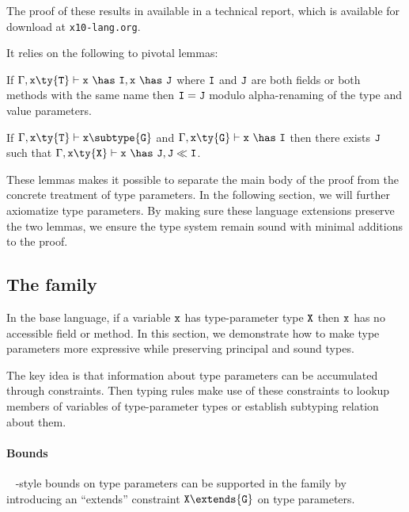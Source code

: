 The proof of these results in available in a technical report, which is available for download at {\tt x10-lang.org}.

It relies on the following to pivotal lemmas:

\begin{lemma}
If $\Gamma,{\tt x}\ty{\tt T}\vdash{\tt x}~\has~{\tt I},{\tt x}~\has~{\tt J}$ where $\tt I$ and $\tt J$ are both fields or both methods with the same name then ${\tt I}={\tt J}$ modulo alpha-renaming of the type and value parameters.
\end{lemma}

\begin{lemma}
If $\Gamma,{\tt x}\ty{\tt T}\vdash{\tt x}\subtype{\tt G}$ and $\Gamma,{\tt x}\ty{\tt G}\vdash{\tt x}~\has~{\tt I}$ then there exists $\tt J$ such that $\Gamma,{\tt x}\ty{\tt X}\vdash{\tt x}~\has~{\tt J}, {\tt J} \ll {\tt I}$.
\end{lemma}

These lemmas makes it possible to separate the main body of the proof from the concrete treatment of type parameters. In the following section, we will further axiomatize type parameters. By making sure these language extensions preserve the two lemmas, we ensure the type system remain sound with minimal additions to the proof.

\subsection{The \FXG family}

In the base \FXG language, if a variable $\tt x$ has type-parameter type $\tt X$ then $\tt x$ has no accessible field or method. In this section, we demonstrate how to make type parameters more expressive while preserving principal and sound types.

The key idea is that information about type parameters can be accumulated through constraints. Then typing rules make use of these constraints to lookup members of variables of type-parameter types or establish subtyping relation about them.

\paragraph{Bounds}~ \FGJ-style bounds on type parameters can be supported in the \FXG family by introducing an ``extends'' constraint \mbox{${\tt X}\extends{\tt G}$} on type parameters.


